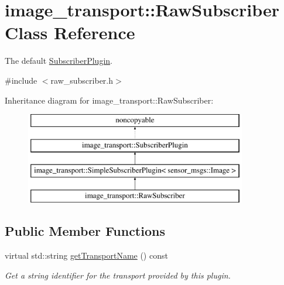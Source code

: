 \hypertarget{classimage__transport_1_1_raw_subscriber}{\section{image\-\_\-transport\-:\-:Raw\-Subscriber Class Reference}
\label{classimage__transport_1_1_raw_subscriber}
}


The default \hyperlink{classimage__transport_1_1_subscriber_plugin}{Subscriber\-Plugin}.  




{\ttfamily \#include $<$raw\-\_\-subscriber.\-h$>$}

Inheritance diagram for image\-\_\-transport\-:\-:Raw\-Subscriber\-:\begin{figure}[H]
\begin{center}
\leavevmode
\includegraphics[height=4.000000cm]{classimage__transport_1_1_raw_subscriber}
\end{center}
\end{figure}
\subsection*{Public Member Functions}
\begin{DoxyCompactItemize}
\item 
\hypertarget{classimage__transport_1_1_raw_subscriber_a9c570fff1410a5b3f0fa40bc9705d135}{virtual std\-::string \hyperlink{classimage__transport_1_1_raw_subscriber_a9c570fff1410a5b3f0fa40bc9705d135}{get\-Transport\-Name} () const }\label{classimage__transport_1_1_raw_subscriber_a9c570fff1410a5b3f0fa40bc9705d135}

\begin{DoxyCompactList}\small\item\em Get a string identifier for the transport provided by this plugin. \end{DoxyCompactList}\end{DoxyCompactItemize}
